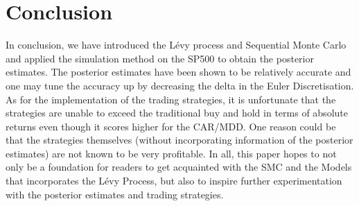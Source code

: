 \documentclass[12pt]{article}
\theoremstyle{definition}
\begin{document}
\section{Conclusion}
In conclusion, we have introduced the L\'evy process and Sequential Monte Carlo and applied the simulation method on the SP500 to obtain the posterior estimates. The posterior estimates have been shown to be relatively accurate and one may tune the accuracy up by decreasing the delta in the Euler Discretisation. As for the implementation of the trading strategies, it is unfortunate that the strategies are unable to exceed the traditional buy and hold in terms of absolute returns even though it scores higher for the CAR/MDD. One reason could be that the strategies themselves (without incorporating information of the posterior estimates) are not known to be very profitable. In  all, this paper hopes to not only be a foundation for readers to get acquainted with the SMC and the Models that incorporates the L\'evy Process, but also to inspire further experimentation with the posterior estimates and trading strategies.
\end{document}
